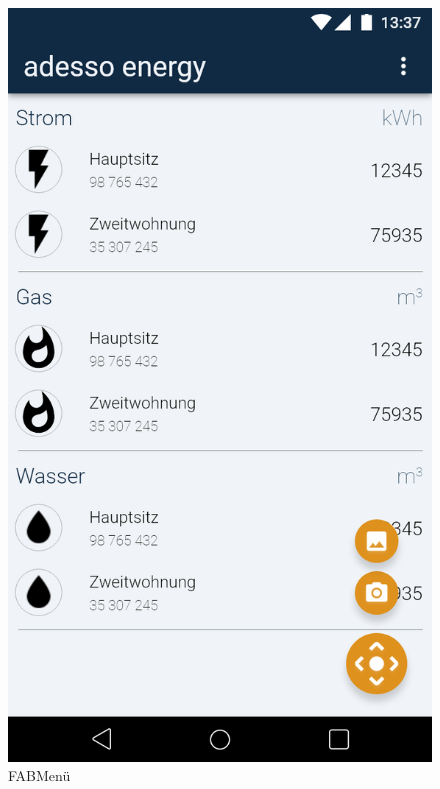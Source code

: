 \begin{figure}[h]
	\includegraphics[scale = 0.22]{img/AndroidMockup/FABMenu}		
	\caption{FABMenü}
	\label{fig:mock-pw}
\end{figure}


